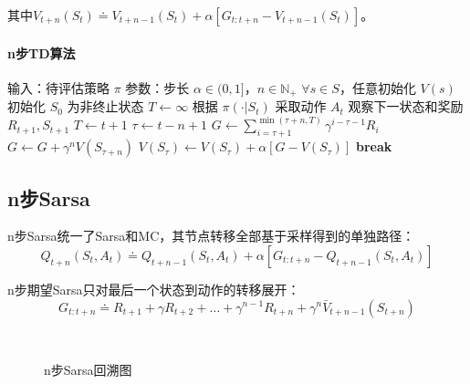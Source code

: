 \documentclass[
12pt, %
a4paper, 
oneside, %
headinclude,footinclude, %
]{scrartcl}
\begin{document}
其中$ V_{t + n}(S_t) \doteq V_{t + n - 1}(S_t) + \alpha[G_{t:t + n} - V_{t + n - 1}(S_t)] $。
\paragraph{n步TD算法}
\begin{myalgorithm}[n步TD预测算法]
\State 输入：待评估策略 $\pi$
\State 参数：步长 $\alpha \in (0,1]$，$n \in \mathbb{N}_+$
\State $\forall s \in S$，任意初始化 $V(s)$
    \State 初始化 $S_0$ 为非终止状态
    \State $T \gets \infty$
            \State 根据 $\pi(\cdot|S_t)$ 采取动作 $A_t$
            \State 观察下一状态和奖励 $R_{t+1}, S_{t+1}$
                \State $T \gets t+1$
            \EndIf
        \EndIf
        \State $\tau \gets t-n+1$ 
            \State $G \gets \sum_{i=\tau+1}^{\min(\tau+n,T)} \gamma^{i-\tau-1}R_i$
                \State $G \gets G + \gamma^n V(S_{\tau+n})$
            \EndIf
            \State $V(S_{\tau}) \gets V(S_{\tau}) + \alpha[G - V(S_{\tau})]$
        \EndIf
            \State \textbf{break}
        \EndIf
    \EndFor
\EndFor
\end{myalgorithm}
\subsection{n步Sarsa}
n步Sarsa统一了Sarsa和MC，其节点转移全部基于采样得到的单独路径：
$$ Q_{t + n}(S_t, A_t) \doteq Q_{t + n - 1}(S_t, A_t) + \alpha [G_{t:t + n} - Q_{t + n - 1}(S_t, A_t)] $$

n步期望Sarsa只对最后一个状态到动作的转移展开：
$$ G_{t:t + n} \doteq R_{t + 1} + \gamma R_{t + 2} + \dots + \gamma^{n - 1} R_{t + n} + \gamma^n \bar{V}_{t + n - 1}(S_{t + n}) $$

\begin{figure}[H]
\centering
{} \\
\caption[n步Sarsa回溯图]{n步Sarsa回溯图}
\end{figure}
\end{document}
